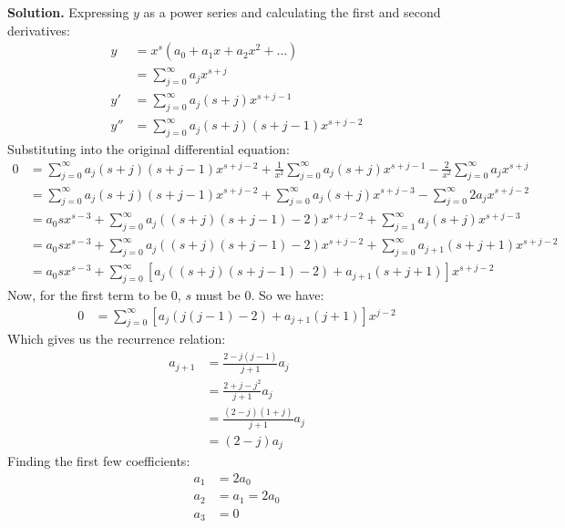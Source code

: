 \documentclass{article}
\begin{document}
\textbf{Solution.} Expressing $y$ as a power series and calculating the first and second derivatives:
\begin{equation*}
\begin{aligned}
	y &= x^s(a_0 + a_1 x + a_2 x^2 + \dots ) \\
	  &= \sum_{j=0}^\infty a_j x^{s+j} \\
	y' &= \sum_{j=0}^\infty a_j(s+j)  x^{s+j-1}\\
	y'' &= \sum_{j=0}^\infty a_j(s+j)(s+j-1) x^{s+j-2}
\end{aligned}
\end{equation*}
Substituting into the original differential equation:
\begin{equation*}
\begin{aligned}
	0 &= \sum_{j=0}^\infty a_j(s+j)(s+j-1) x^{s+j-2} + \frac{1}{x^2}\sum_{j=0}^\infty a_j(s+j)  x^{s+j-1} -\frac{2}{x^2}\sum_{j=0}^\infty a_j x^{s+j} \\
	&= \sum_{j=0}^\infty a_j(s+j)(s+j-1) x^{s+j-2} + \sum_{j=0}^\infty a_j(s+j)  x^{s+j-3} -\sum_{j=0}^\infty 2a_j x^{s+j-2} \\
	&= a_0 sx^{s-3} + \sum_{j=0}^\infty a_j\left((s+j)(s+j-1)-2\right)x^{s+j-2} + \sum_{j=1}^\infty a_j(s+j)  x^{s+j-3} \\
	&= a_0 sx^{s-3} + \sum_{j=0}^\infty a_j\left((s+j)(s+j-1)-2\right)x^{s+j-2} + \sum_{j=0}^\infty a_{j+1}(s+j+1)  x^{s+j-2} \\
	&= a_0 sx^{s-3} + \sum_{j=0}^\infty \left[a_j((s+j)(s+j-1)-2)+a_{j+1}(s+j+1)\right]x^{s+j-2}
\end{aligned}
\end{equation*}
Now, for the first term to be 0, $s$ must be 0. So we have:
\begin{equation*}
\begin{aligned}
	0 &= \sum_{j=0}^\infty \left[a_j(j(j-1)-2)+a_{j+1}(j+1)\right]x^{j-2}
\end{aligned}
\end{equation*}
Which gives us the recurrence relation:
\begin{equation*}
\begin{aligned}
	a_{j+1} &= \frac{2-j(j-1)}{j+1}a_j \\
	&= \frac{2+j-j^2}{j+1}a_j \\
	&= \frac{(2-j)(1+j)}{j+1}a_j \\
	&= (2-j)a_j
\end{aligned}
\end{equation*}
Finding the first few coefficients:
\begin{equation*}
\begin{aligned}
	a_1 &= 2a_0 \\
	a_2 &= a_1 = 2a_0 \\
	a_3 &= 0
\end{aligned}
\end{equation*}
\end{document}
